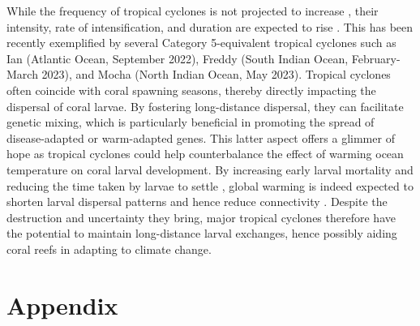 \documentclass[fleqn,10pt]{wlscirep}
\newcommand{\emphc}[1]{\emph{\textcolor{red}{#1}}}
\newcommand{\dobby}[1]{\emph{\textcolor{blue}{#1}}}
\begin{document}
While the frequency of tropical cyclones is not projected to increase \citep{walsh2019tropical}, their intensity, rate of intensification, and duration are expected to rise \citep{bhatia2022potential}. This has been recently exemplified by several Category 5-equivalent tropical cyclones such as Ian (Atlantic Ocean, September 2022), Freddy (South Indian Ocean, February-March 2023), and Mocha (North Indian Ocean, May 2023). Tropical cyclones often coincide with coral spawning seasons, thereby directly impacting the dispersal of coral larvae. By fostering long-distance dispersal, they can facilitate genetic mixing, which is particularly beneficial in promoting the spread of disease-adapted or warm-adapted genes. This latter aspect offers a glimmer of hope as tropical cyclones could help counterbalance the effect of warming ocean temperature on coral larval development. By increasing early larval mortality and reducing the time taken by larvae to settle \citep{nozawa2007effects, heyward2010plasticity}, global warming is indeed expected to shorten larval dispersal patterns and hence reduce connectivity \citep{Figueiredo2022Jan}. Despite the destruction and uncertainty they bring, major tropical cyclones therefore have the potential to maintain long-distance larval exchanges, hence possibly aiding coral reefs in adapting to climate change.



\section*{Appendix}
\end{document}
